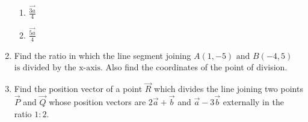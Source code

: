 \begin{enumerate}[label=\thesubsection.\arabic*,ref=\thesubsection.\theenumi]
\begin{enumerate}
\item $\frac{\vec{3a}}{4}$
\item $\frac{\vec{5a}}{4}$
\end{enumerate}
\item Find the ratio in which the line segment joining $A(1,-5) \text{ and } B(-4,5)$ $\text{is divided by the x-axis}$. Also find the coordinates of the point of division.
\item Find the position vector of a point $\vec{R}$ which divides the line joining two points $\vec{P}$ and $\vec{Q}$ whose position vectors are $2\vec{a}+\vec{b}$ and $\vec{a}-3\vec{b}$ externally in the ratio $1:2$.
\end{enumerate}


